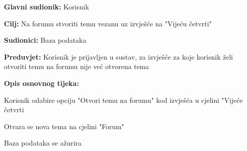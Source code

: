 					\noindent {}
					\begin{packed_item}
	
						\item \textbf{Glavni sudionik: }Korisnik
						\item  \textbf{Cilj:} Na forumu stvoriti temu vezanu uz izvješće na "Vijeću četvrti"
						\item  \textbf{Sudionici:} Baza podataka
						\item  \textbf{Preduvjet:} Korisnik je prijavljen u sustav, za izvješće za koje korisnik želi otvoriti temu na forumu nije već otvorena tema
						\item  \textbf{Opis osnovnog tijeka:}
						
						\item[] \begin{packed_enum}
	
							\item Korisnik odabire opciju "Otvori temu na forumu" kod izvješća u cjelini "Vijeće četvrti
							\item Otvara se nova tema na cjelini "Forum"
							\item Baza podataka se ažurira
							
						\end{packed_enum}				
						
					\end{packed_item}
					
